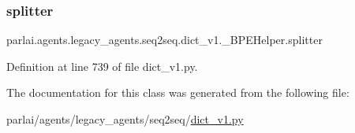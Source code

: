 \subsubsection{\texorpdfstring{splitter}{splitter}}
{\footnotesize\ttfamily parlai.\+agents.\+legacy\+\_\+agents.\+seq2seq.\+dict\+\_\+v1.\+\_\+\+B\+P\+E\+Helper.\+splitter}



Definition at line 739 of file dict\+\_\+v1.\+py.



The documentation for this class was generated from the following file\+:\begin{DoxyCompactItemize}
\item 
parlai/agents/legacy\+\_\+agents/seq2seq/\hyperlink{dict__v1_8py}{dict\+\_\+v1.\+py}\end{DoxyCompactItemize}
